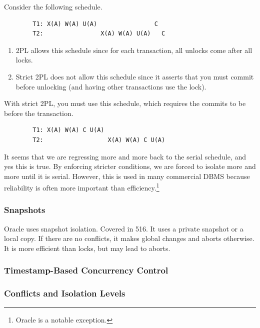     \begin{example}[2PL vs Strict 2PL]
      Consider the following schedule. 
      \begin{lstlisting}
        T1: X(A) W(A) U(A)                C
        T2:                X(A) W(A) U(A)   C
      \end{lstlisting}
      \begin{enumerate}
        \item 2PL allows this schedule since for each transaction, all unlocks come after all locks. 
        \item Strict 2PL does not allow this schedule since it asserts that you must commit before unlocking (and having other transactions use the lock). 
      \end{enumerate} 
      With strict 2PL, you must use this schedule, which requires the commits to be before the transaction. 
      \begin{lstlisting}
        T1: X(A) W(A) C U(A) 
        T2:                  X(A) W(A) C U(A)
      \end{lstlisting}
    \end{example}

    It seems that we are regressing more and more back to the serial schedule, and yes this is true. By enforcing stricter conditions, we are forced to isolate more and more until it is serial. However, this is used in many commercial DBMS because reliability is often more important than efficiency.\footnote{Oracle is a notable exception.} 

  \subsubsection{Snapshots} 
    
    Oracle uses snapshot isolation. Covered in 516. It uses a private snapshot or a local copy. If there are no conflicts, it makes global changes and aborts otherwise. It is more efficient than locks, but may lead to aborts.  

  \subsubsection{Timestamp-Based Concurrency Control} 
    
    

  \subsubsection{Conflicts and Isolation Levels}


